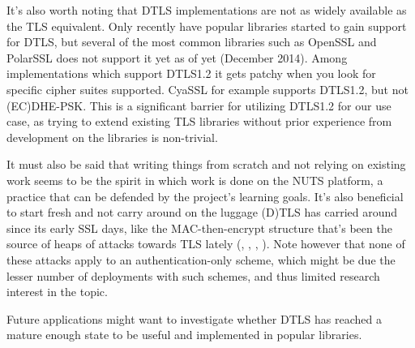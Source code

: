It's also worth noting that DTLS implementations are not as widely available as the TLS equivalent. Only recently have popular libraries started to gain support for DTLS, but several of the most common libraries such as OpenSSL and PolarSSL does not support it yet as of yet (December 2014). Among implementations which support DTLS1.2 it gets patchy when you look for specific cipher suites supported. CyaSSL for example supports DTLS1.2, but not (EC)DHE-PSK. This is a significant barrier for utilizing DTLS1.2 for our use case, as trying to extend existing TLS libraries without prior experience from development on the libraries is non-trivial.

It must also be said that writing things from scratch and not relying on existing work seems to be the spirit in which work is done on the NUTS platform, a practice that can be defended by the project's learning goals. It's also beneficial to start fresh and not carry around on the luggage (D)TLS has carried around since its early SSL days, like the MAC-then-encrypt structure that's been the source of heaps of attacks towards TLS lately (\cite[Lucky Thirteen]{lucky-thirteen}, \cite[BEAST]{beast}, \cite[CRIME/BREACH]{breach}, \cite[POODLE]{poodle}). Note however that none of these attacks apply to an authentication-only scheme, which might be due the lesser number of deployments with such schemes, and thus limited research interest in the topic.

Future applications might want to investigate whether DTLS has reached a mature enough state to be useful and implemented in popular libraries.

